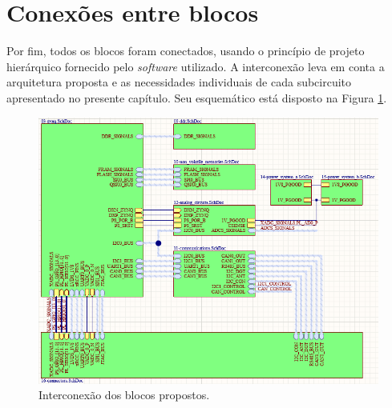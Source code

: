\section{Conexões entre blocos}

Por fim, todos os blocos foram conectados, usando o princípio de projeto hierárquico fornecido pelo \textit{software} utilizado. A interconexão leva em conta a arquitetura proposta e as necessidades individuais de cada subcircuito apresentado no presente capítulo. Seu esquemático está disposto na Figura \ref{fig:inter}.

\begin{figure}[H]
    \centering
    \includegraphics[scale=0.7]{images/conexoes.png}
    \caption{Interconexão dos blocos propostos.}
    \label{fig:inter}
\end{figure}

